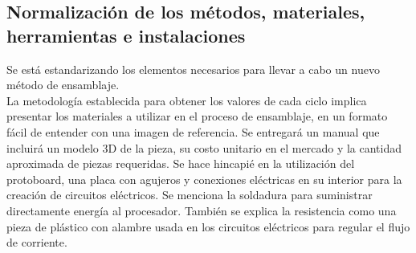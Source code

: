     \subsection{Normalización de los métodos, materiales, herramientas e instalaciones}
    Se está estandarizando los elementos necesarios para llevar a cabo un nuevo método de ensamblaje.\\ La metodología establecida para obtener los valores de cada ciclo implica presentar los materiales a utilizar en el proceso de ensamblaje, en un formato fácil de entender con una imagen de referencia. Se entregará un manual que incluirá un modelo 3D de la pieza, su costo unitario en el mercado y la cantidad aproximada de piezas requeridas. Se hace hincapié en la utilización del protoboard, una placa con agujeros y conexiones eléctricas en su interior para la creación de circuitos eléctricos. Se menciona la soldadura para suministrar directamente energía al procesador. También se explica la resistencia como una pieza de plástico con alambre usada en los circuitos eléctricos para regular el flujo de corriente.
